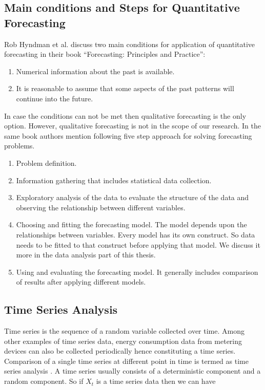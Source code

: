 \subsection{Main conditions and Steps for Quantitative Forecasting}\label{conditions}
Rob Hyndman et al. \cite{hyndman2014forecasting} discuss two main conditions for application of quantitative forecasting in their book ``Forecasting: Principles and Practice'':
\begin{enumerate}
\item Numerical information about the past is available.
\item It is reasonable to assume that some aspects of the past patterns will continue into the future.
\end{enumerate}
In case the conditions can not be met then qualitative forecasting is the only option. However, qualitative forecasting is not in the scope of our research. In the same book authors mention following five step approach for solving forecasting problems.
\begin{enumerate}
\item Problem definition.
\item Information gathering that includes statistical data collection.
\item Exploratory analysis of the data to evaluate the structure of the data and observing the relationship between different variables.
\item Choosing and fitting the forecasting model. The model depends upon the relationships between variables. Every model has its own construct. So data needs to be fitted to that construct before applying that model. We discuss it more in the data analysis part of this thesis.
\item Using and evaluating the forecasting model. It generally includes comparison of results after applying different models.  
\end{enumerate}    

\subsection{Time Series Analysis}
Time series is the sequence of a random variable collected over time. Among other examples of time series data, energy consumption data from metering devices can also be collected periodically hence constituting a time series. Comparison of a single time series at different point in time is termed as time series analysis \cite{box1976time}. A time series usually consists of a deterministic component and a random component\cite{mujumdarstochastic}. So if \(X_{t}\) is a time series data then we can have 

